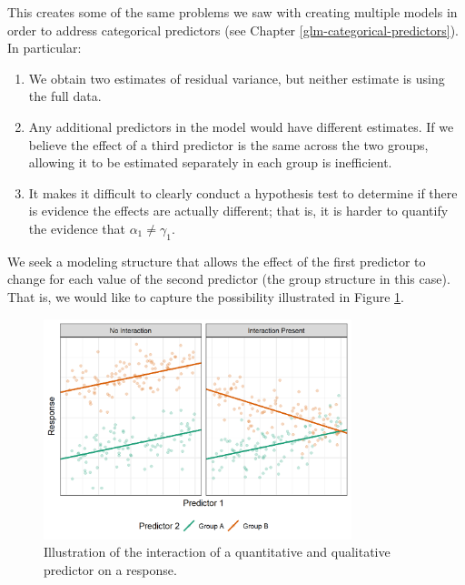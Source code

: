 \documentclass[
]{book}
\providecommand{\tightlist}{%
  \setlength{\itemsep}{0pt}\setlength{\parskip}{0pt}}
\theoremstyle{plain}
\theoremstyle{mydefn}
\theoremstyle{myexmpl}
\theoremstyle{remark}
\begin{document}
This creates some of the same problems we saw with creating multiple models in order to address categorical predictors (see Chapter \ref{glm-categorical-predictors}). In particular:

\begin{enumerate}
\def\labelenumi{\arabic{enumi}.}
\tightlist
\item
  We obtain two estimates of residual variance, but neither estimate is using the full data.
\item
  Any additional predictors in the model would have different estimates. If we believe the effect of a third predictor is the same across the two groups, allowing it to be estimated separately in each group is inefficient.
\item
  It makes it difficult to clearly conduct a hypothesis test to determine if there is evidence the effects are actually different; that is, it is harder to quantify the evidence that \(\alpha_1 \neq \gamma_1\).
\end{enumerate}

We seek a modeling structure that allows the effect of the first predictor to change for each value of the second predictor (the group structure in this case). That is, we would like to capture the possibility illustrated in Figure \ref{fig:glm-interactions-interactions}.

\begin{figure}

{\centering \includegraphics[width=0.8\textwidth]{./Images/glm-interactions-interactions-1} 

}

\caption{Illustration of the interaction of a quantitative and qualitative predictor on a response.}\label{fig:glm-interactions-interactions}
\end{figure}
\end{document}
